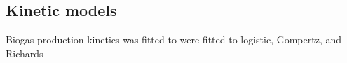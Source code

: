 \subsection{Kinetic models}
Biogas production kinetics was fitted to were fitted to logistic, Gompertz, and
Richards